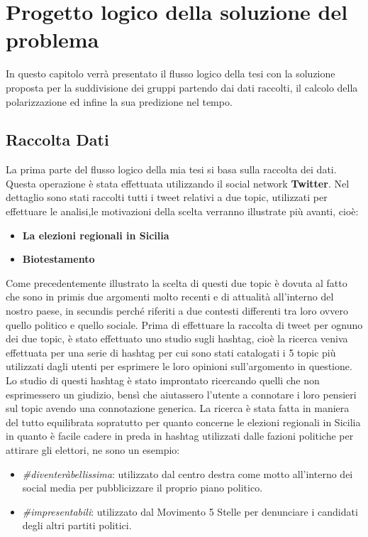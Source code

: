 \chapter{Progetto logico della soluzione del problema}
\label{capitolo4}
\thispagestyle{empty}

\noindent %

In questo capitolo verrà presentato il flusso logico della tesi con la soluzione proposta per la suddivisione dei gruppi partendo dai dati raccolti, il calcolo della polarizzazione ed infine la sua predizione nel tempo.

\section{Raccolta Dati}
La prima parte del flusso logico della mia tesi si basa sulla raccolta dei dati. Questa operazione è stata effettuata utilizzando il social network \textbf{Twitter}. Nel dettaglio sono stati raccolti tutti i tweet relativi a due topic, utilizzati per effettuare le analisi,le motivazioni della scelta verranno illustrate più avanti, cioè:
\begin{itemize}
\item \textbf{La elezioni regionali in Sicilia}
\item \textbf{Biotestamento}
\end{itemize}
Come precedentemente illustrato la scelta di questi due topic è dovuta al fatto che sono in primis due argomenti molto recenti e di attualità all'interno del nostro paese, in secundis perché riferiti a due contesti differenti tra loro ovvero quello politico e quello sociale.
Prima di effettuare la raccolta di tweet per ognuno dei due topic, è stato effettuato uno studio sugli hashtag, cioè la ricerca veniva effettuata per una serie di hashtag per cui sono stati catalogati i 5 topic più utilizzati dagli utenti per esprimere le loro opinioni sull'argomento in questione.
Lo studio di questi hashtag è stato improntato ricercando quelli che non esprimessero un giudizio, bensì che aiutassero l'utente a connotare i loro pensieri sul topic avendo una connotazione generica.
La ricerca è stata fatta in maniera del tutto equilibrata sopratutto per quanto concerne le elezioni regionali in Sicilia in quanto è facile cadere in preda in hashtag utilizzati dalle fazioni politiche per attirare gli elettori, ne sono un esempio:
\begin{itemize}
\item \textit{\#diventeràbellissima}: utilizzato dal centro destra come motto all'interno dei social media per pubblicizzare il proprio piano politico.
\item \textit{\#impresentabili}: utilizzato dal Movimento 5 Stelle per denunciare i candidati degli altri partiti politici.
\end{itemize} 
